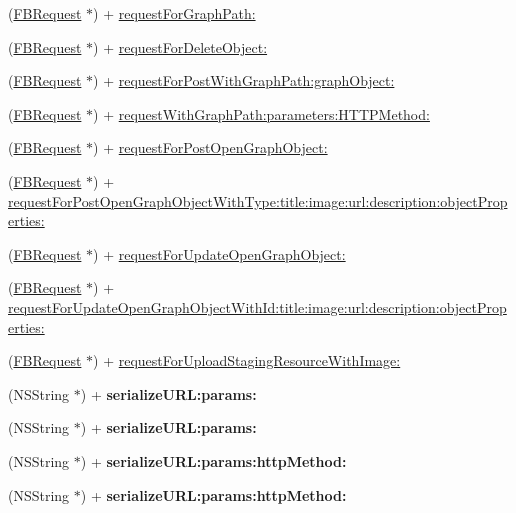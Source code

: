 \begin{DoxyCompactItemize}
\item 
(\hyperlink{interfaceFBRequest}{F\+B\+Request} $\ast$) + \hyperlink{interfaceFBRequest_a33356f35896b2f50d96ed24c8ddf5841}{request\+For\+Graph\+Path\+:}
\item 
(\hyperlink{interfaceFBRequest}{F\+B\+Request} $\ast$) + \hyperlink{interfaceFBRequest_a6d457b796765de6b436e5ff6cf11cc44}{request\+For\+Delete\+Object\+:}
\item 
(\hyperlink{interfaceFBRequest}{F\+B\+Request} $\ast$) + \hyperlink{interfaceFBRequest_ac3f506dd49d0757265f44b41c9579c8b}{request\+For\+Post\+With\+Graph\+Path\+:graph\+Object\+:}
\item 
(\hyperlink{interfaceFBRequest}{F\+B\+Request} $\ast$) + \hyperlink{interfaceFBRequest_a2e3ee15f72f7e3380495fcf1660154ce}{request\+With\+Graph\+Path\+:parameters\+:\+H\+T\+T\+P\+Method\+:}
\item 
(\hyperlink{interfaceFBRequest}{F\+B\+Request} $\ast$) + \hyperlink{interfaceFBRequest_a7eed076cb1c83e3dfe4f29ccfebe68b4}{request\+For\+Post\+Open\+Graph\+Object\+:}
\item 
(\hyperlink{interfaceFBRequest}{F\+B\+Request} $\ast$) + \hyperlink{interfaceFBRequest_aa5c66ef020233f0de4a26473a8b7c87b}{request\+For\+Post\+Open\+Graph\+Object\+With\+Type\+:title\+:image\+:url\+:description\+:object\+Properties\+:}
\item 
(\hyperlink{interfaceFBRequest}{F\+B\+Request} $\ast$) + \hyperlink{interfaceFBRequest_ab92e50866d79923cfb17f1f96f06530b}{request\+For\+Update\+Open\+Graph\+Object\+:}
\item 
(\hyperlink{interfaceFBRequest}{F\+B\+Request} $\ast$) + \hyperlink{interfaceFBRequest_a9accf3aae3b94802e07a0358979bf37d}{request\+For\+Update\+Open\+Graph\+Object\+With\+Id\+:title\+:image\+:url\+:description\+:object\+Properties\+:}
\item 
(\hyperlink{interfaceFBRequest}{F\+B\+Request} $\ast$) + \hyperlink{interfaceFBRequest_a4a85038bef70a9edd91a56ab0db0bfd6}{request\+For\+Upload\+Staging\+Resource\+With\+Image\+:}
\item 
\mbox{\label{interfaceFBRequest_a9af2ee5d05bb50e35d4104b2a63d45fe}} 
(N\+S\+String $\ast$) + {\bfseries serialize\+U\+R\+L\+:params\+:}
\item 
\mbox{\label{interfaceFBRequest_a9af2ee5d05bb50e35d4104b2a63d45fe}} 
(N\+S\+String $\ast$) + {\bfseries serialize\+U\+R\+L\+:params\+:}
\item 
\mbox{\label{interfaceFBRequest_a498b1abe723bbd55987c69ab2ede78ae}} 
(N\+S\+String $\ast$) + {\bfseries serialize\+U\+R\+L\+:params\+:http\+Method\+:}
\item 
\mbox{\label{interfaceFBRequest_a498b1abe723bbd55987c69ab2ede78ae}} 
(N\+S\+String $\ast$) + {\bfseries serialize\+U\+R\+L\+:params\+:http\+Method\+:}
\end{DoxyCompactItemize}
